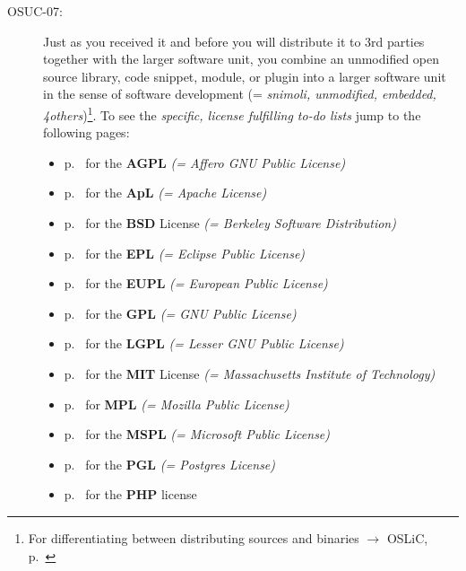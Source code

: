 \begin{description}
\item[OSUC-07:]\label{OSUC-07-DEF} Just as you received it and before you will
distribute it to 3rd parties together with the larger software unit, you combine
an unmodified open source library, code snippet, module, or plugin into a larger
software unit in the sense of software development (= \textit{snimoli,
unmodified, embedded, 4others})\footnote{For differentiating between
distributing sources and binaries $\rightarrow$ OSLiC, p.\
\pageref{sec:SourceBinaryDifference}}.
To see the \textit{specific, license fulfilling to-do lists} jump to the
following pages:
   \begin{itemize}
    \item p.\ \pageref{OSUC-07-AGPL} for the \textbf{AGPL}
      \textit{(= Affero GNU Public License)} 
    \item p.\ \pageref{OSUC-07-Apache20} for the \textbf{ApL}
      \textit{(= Apache License)}
    \item p.\ \pageref{OSUC-07-BSD} for the \textbf{BSD} License
      \textit{(= Berkeley Software Distribution)}
    \item p.\ \pageref{OSUC-07-EPL} for the \textbf{EPL}
      \textit{(= Eclipse Public License)}     
    \item p.\ \pageref{OSUC-07-EUPL} for the \textbf{EUPL}
      \textit{(= European Public License)} 
    \item p.\ \pageref{OSUC-07-GPL} for the \textbf{GPL}
       \textit{(= GNU Public License)} 
    \item p.\ \pageref{OSUC-07-LGPL} for the \textbf{LGPL}
      \textit{(= Lesser GNU Public License)}           
    \item p.\ \pageref{OSUC-07-MIT} for the \textbf{MIT} License
       \textit{(= Massachusetts Institute of Technology)} 
    \item p.\ \pageref{OSUC-07-MPL} for \textbf{MPL}
      \textit{(= Mozilla Public License)}     
    \item p.\ \pageref{OSUC-07-MsPL} for the \textbf{MSPL}
      \textit{(= Microsoft Public License)} 
    \item p.\ \pageref{OSUC-07-PGL} for the \textbf{PGL}
      \textit{(= Postgres License)} 
    \item p.\ \pageref{OSUC-07-PHP} for the \textbf{PHP} license 
  \end{itemize}


\end{description}
